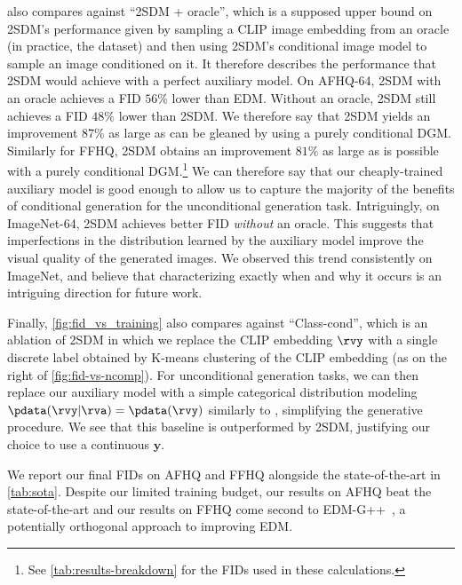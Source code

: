  also compares against ``2SDM + oracle'', which is a supposed upper bound on 2SDM's performance given by sampling a CLIP image embedding from an oracle (in practice, the dataset) and then using 2SDM's conditional image model to sample an image conditioned on it. It therefore describes the performance that 2SDM would achieve with a perfect auxiliary model. On AFHQ-64, 2SDM with an oracle achieves a FID $56\%$ lower than EDM. Without an oracle, 2SDM still achieves a FID $48\%$ lower than 2SDM. We therefore say that 2SDM yields an improvement $87\%$ as large as can be gleaned by using a purely conditional DGM. Similarly for FFHQ, 2SDM obtains an improvement $81\%$ as large as is possible with a purely conditional DGM.\footnote{See \cref{tab:results-breakdown} for the FIDs used in these calculations.} We can therefore say that our cheaply-trained auxiliary model is good enough to allow us to capture the majority of the benefits of conditional generation for the unconditional generation task. Intriguingly,
 on ImageNet-64, 2SDM achieves better FID \textit{without} an oracle. This suggests that imperfections in the distribution
learned by the auxiliary model improve the visual quality of the generated images. We observed this trend consistently on ImageNet, and believe that characterizing exactly when and why it occurs is an intriguing direction for future work.

Finally, \cref{fig:fid_vs_training} also compares against ``Class-cond'', which is an ablation of 2SDM in which we replace the CLIP embedding $\rvy$ with a single discrete label obtained by K-means clustering of the CLIP embedding (as on the right of \cref{fig:fid-vs-ncomp}). For unconditional generation tasks, we can then replace our auxiliary model with a simple categorical distribution modeling $\pdata(\rvy|\rva)=\pdata(\rvy)$ similarly to \citet{hu2022self}, simplifying the generative procedure. We see that this baseline is outperformed by 2SDM, justifying our choice to use a continuous $\mathbf{y}$.

We report our final FIDs on AFHQ and FFHQ alongside the state-of-the-art in \cref{tab:sota}. Despite our limited training budget, our results on AFHQ beat the state-of-the-art and our results on FFHQ come second to EDM-G++~\citep{kim2022refining}, a potentially orthogonal approach to improving EDM.



